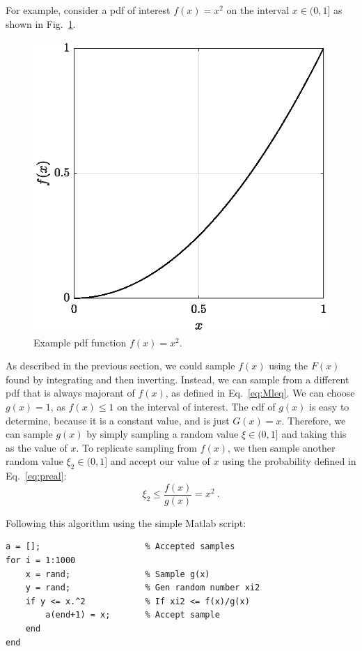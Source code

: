 For example, consider a
\gls{pdf} of interest $f(x) = x^2$ on the interval $x \in (0,1]$ as shown
in Fig.~\ref{fig:circle_square}.
\begin{figure}[hbt]
  \centering
  \includegraphics[scale=0.75]{images/circle}
  \caption{Example \acrshort{pdf} function $f(x) = x^2$.}
  \label{fig:circle_square}
\end{figure}
As described in the previous section, we could sample $f(x)$ using the
$F(x)$ found by integrating and then inverting. Instead, we can sample from a
different \gls{pdf} that is always majorant of $f(x)$, as defined in
Eq.~\eqref{eq:Mleq}. We can choose $g(x) = 1$, as $f(x) \leq 1$ on
the interval of interest. The \gls{cdf} of $g(x)$ is easy to
determine, because it is a constant value, and is just $G(x) =
x$. Therefore, we can sample $g(x)$ by simply sampling a random value $\xi
\in (0,1]$ and taking this as the value of $x$. To replicate sampling
from $f(x)$, we then sample another random value $\xi_2 \in (0,1]$ and
accept our value of $x$ using the probability defined in Eq.~\eqref{eq:preal}:
\begin{equation*}
  \xi_2 \leq \frac{f(x)}{g(x)} = x^2\:.
\end{equation*}

\begin{minipage}{1.0\linewidth}
Following this algorithm using the simple Matlab script:
\begin{lstlisting}
a = [];                     % Accepted samples
for i = 1:1000
    x = rand;               % Sample g(x)
    y = rand;               % Gen random number xi2
    if y <= x.^2            % If xi2 <= f(x)/g(x)
        a(end+1) = x;       % Accept sample
    end
end
\end{lstlisting}
\end{minipage}

